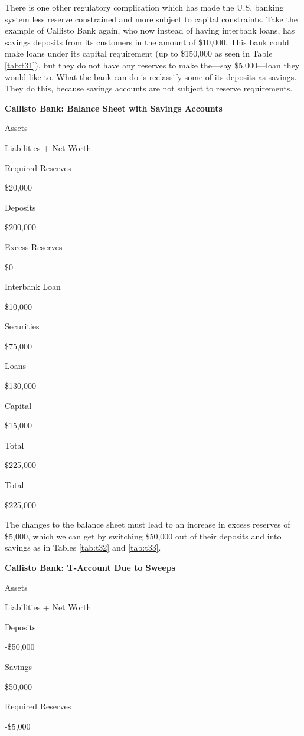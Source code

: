 \documentclass[
]{book}
\begin{document}
There is one other regulatory complication which has made the U.S. banking system less reserve constrained and more subject to capital constraints. Take the example of Callisto Bank again, who now instead of having interbank loans, has savings deposits from its customers in the amount of \$10,000. This bank could make loans under its capital requirement (up to \$150,000 as seen in Table \ref{tab:t31}), but they do not have any reserves to make the---say \$5,000---loan they would like to. What the bank can do is reclassify some of its deposits as savings. They do this, because savings accounts are not subject to reserve requirements.

\label{tab:t31}\textbf{Callisto Bank: Balance Sheet with Savings Accounts}

Assets

Liabilities + Net Worth

Required Reserves

\$20,000

Deposits

\$200,000

Excess Reserves

\$0

Interbank Loan

\$10,000

Securities

\$75,000

Loans

\$130,000

Capital

\$15,000

Total

\$225,000

Total

\$225,000

The changes to the balance sheet must lead to an increase in excess reserves of \$5,000, which we can get by switching \$50,000 out of their deposits and into savings as in Tables \ref{tab:t32} and \ref{tab:t33}.

\label{tab:t32}\textbf{Callisto Bank: T-Account Due to Sweeps}

Assets

Liabilities + Net Worth

Deposits

-\$50,000

Savings

\$50,000

Required Reserves

-\$5,000
\end{document}

